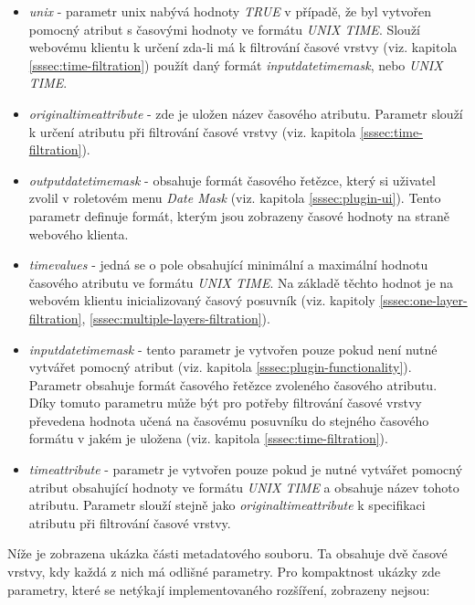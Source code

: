 \begin{itemize}
\item\textit{unix} - parametr unix nabývá hodnoty \textit{TRUE}
v případě, že byl vytvořen pomocný atribut s časovými
hodnoty ve formátu \textit{UNIX TIME}. Slouží webovému
klientu k určení zda-li má k filtrování časové vrstvy
(viz. kapitola \ref{sssec:time-filtration}) použít daný formát
\textit{input\textunderscore datetime\textunderscore mask}, nebo
\textit{UNIX TIME}.
\item\textit{original\textunderscore time\textunderscore attribute}
- zde je uložen název časového atributu. Parametr slouží k
určení atributu při filtrování časové vrstvy (viz. kapitola
\ref{sssec:time-filtration}).
\item\textit{output\textunderscore datetime\textunderscore mask}
- obsahuje formát časového řetězce, který si uživatel
zvolil v roletovém menu \textit{Date Mask} (viz. kapitola
\ref{sssec:plugin-ui}). Tento parametr definuje formát, kterým
jsou zobrazeny časové hodnoty na straně webového klienta.
\item\textit{time\textunderscore values} - jedná se o pole
obsahující minimální a maximální hodnotu časového
atributu ve formátu \textit{UNIX TIME}. Na základě těchto
hodnot je na webovém klientu inicializovaný časový
posuvník (viz. kapitoly \ref{sssec:one-layer-filtration},
\ref{sssec:multiple-layers-filtration}).
\item\textit{input\textunderscore datetime\textunderscore mask} - tento
parametr je vytvořen pouze pokud není nutné vytvářet pomocný
atribut (viz. kapitola \ref{sssec:plugin-functionality}). Parametr
obsahuje formát časového řetězce zvoleného časového
atributu. Díky tomuto parametru může být pro potřeby filtrování
časové vrstvy převedena hodnota učená na časovému posuvníku
do stejného časového formátu v jakém je uložena (viz. kapitola
\ref{sssec:time-filtration}).
\item\textit{time\textunderscore attribute} - parametr
je vytvořen pouze pokud je nutné vytvářet pomocný
atribut obsahující hodnoty ve formátu \textit{UNIX TIME} a
obsahuje název tohoto atributu. Parametr slouží stejně jako
\textit{original\textunderscore time\textunderscore attribute}
k specifikaci atributu při filtrování časové vrstvy.
\end{itemize}

\newpage
\bigskip
\noindent

Níže je zobrazena ukázka části metadatového souboru. Ta obsahuje dvě
časové vrstvy, kdy každá z nich má odlišné parametry. Pro kompaktnost
ukázky zde parametry, které se netýkají implementovaného rozšíření,
zobrazeny nejsou:


